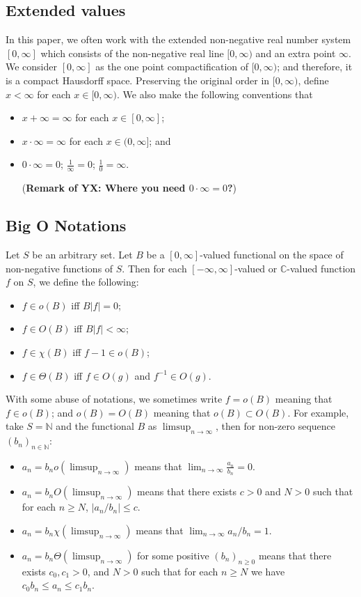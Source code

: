 \documentclass[12pt,a4paper]{amsart}
\numberwithin{equation}{section}
\theoremstyle{plain}
\theoremstyle{definition}
\theoremstyle{remark}
\begin{document}
\subsection{Extended values}
In this paper, we often work with the extended non-negative real number system $[0,\infty]$ which consists of the non-negative real line $[0,\infty)$ and an extra point $\infty$.
We consider $[0,\infty]$ as the one point compactification of $[0,\infty)$; and therefore, it is a compact Hausdorff space.
Preserving the original order in $[0,\infty)$, define $x < \infty$ for each $x\in [0,\infty)$.
We also make the following conventions that
\begin{itemize}
\item
$x + \infty = \infty$ for each $x\in [0,\infty]$;
\item
$x \cdot \infty = \infty$ for each $x\in (0,\infty]$; and
\item
$0 \cdot \infty = 0$; $\frac{1}{\infty} = 0$; $\frac{1}{0} = \infty$.

({\bf Remark of YX: Where you need  $0 \cdot \infty = 0$?})
\end{itemize}
\subsection{Big O Notations}
Let $S$ be an arbitrary set.
Let $B$ be a $[0,\infty]$-valued functional on the space of non-negative functions of $S$.
Then for each $[-\infty, \infty]$-valued or $\mathbb C$-valued function $f$ on $S$, we define the following:
\begin{itemize}
\item
$f \in o(B)$ iff $B |f| = 0$;
\item
$f \in O(B)$ iff $B|f| < \infty$;
\item
$f \in \chi(B)$ iff $f - 1 \in o(B)$;
\item
$f\in \Theta (B)$ iff $f \in O(g)$ and $f^{-1} \in O(g)$.
\end{itemize}
With some abuse of notations, we sometimes write $f = o(B)$ meaning that $f\in o(B)$; and $o(B) = O(B)$ meaning that $o(B) \subset O(B)$.
For example, take $S = \mathbb N $ and the functional $B$ as $\limsup_{n\to \infty}$, then for non-zero sequence $(b_n)_{n\in \mathbb N}$:
\begin{itemize}
\item
$a_n = b_n o(\limsup_{n\to \infty})$ means that $\lim_{n\to \infty}\frac{a_n}{b_n} =0$.
\item
$a_n = b_nO(\limsup_{n\to \infty})$ means that there exists $c>0$ and $N > 0$ such that for each $n\geq N$, $|a_n/b_n| \leq c$.
\item
$a_n = b_n \chi(\limsup_{n\to \infty})$ means that $\lim_{n\to \infty} a_n/b_n = 1$.
\item
$a_n = b_n \Theta (\limsup_{n\to \infty})$ for some positive $(b_n)_{n\geq 0}$ means that there exists $c_0,c_1>0$, and $N > 0$ such that for each $n \geq N$ we have $c_0 b_n \leq a_n \leq c_1b_n$.
\end{itemize}
\end{document}
